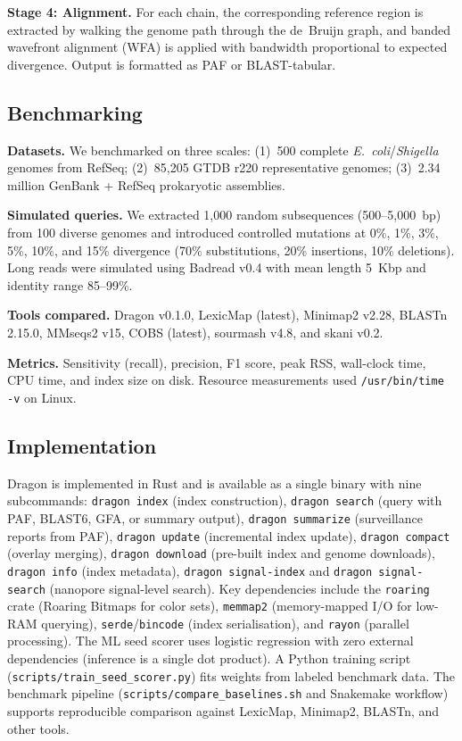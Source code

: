 \documentclass[11pt]{article}
\begin{document}
\textbf{Stage 4: Alignment.} For each chain, the corresponding reference region is extracted by walking the genome path through the de~Bruijn graph, and banded wavefront alignment (WFA) \citep{marco2021fast} is applied with bandwidth proportional to expected divergence. Output is formatted as PAF or BLAST-tabular.

\subsection{Benchmarking}

\textbf{Datasets.} We benchmarked on three scales: (1)~500 complete \textit{E.~coli}/\textit{Shigella} genomes from RefSeq; (2)~85,205 GTDB r220 representative genomes; (3)~2.34 million GenBank + RefSeq prokaryotic assemblies.

\textbf{Simulated queries.} We extracted 1,000 random subsequences (500--5,000~bp) from 100 diverse genomes and introduced controlled mutations at 0\%, 1\%, 3\%, 5\%, 10\%, and 15\% divergence (70\% substitutions, 20\% insertions, 10\% deletions). Long reads were simulated using Badread v0.4 with mean length 5~Kbp and identity range 85--99\%.

\textbf{Tools compared.} Dragon v0.1.0, LexicMap (latest), Minimap2 v2.28, BLASTn 2.15.0, MMseqs2 v15, COBS (latest), sourmash v4.8, and skani v0.2.

\textbf{Metrics.} Sensitivity (recall), precision, F1 score, peak RSS, wall-clock time, CPU time, and index size on disk. Resource measurements used \texttt{/usr/bin/time -v} on Linux.

\subsection{Implementation}

Dragon is implemented in Rust and is available as a single binary with nine subcommands: \texttt{dragon index} (index construction), \texttt{dragon search} (query with PAF, BLAST6, GFA, or summary output), \texttt{dragon summarize} (surveillance reports from PAF), \texttt{dragon update} (incremental index update), \texttt{dragon compact} (overlay merging), \texttt{dragon download} (pre-built index and genome downloads), \texttt{dragon info} (index metadata), \texttt{dragon signal-index} and \texttt{dragon signal-search} (nanopore signal-level search). Key dependencies include the \texttt{roaring} crate (Roaring Bitmaps for color sets), \texttt{memmap2} (memory-mapped I/O for low-RAM querying), \texttt{serde}/\texttt{bincode} (index serialisation), and \texttt{rayon} (parallel processing). The ML seed scorer uses logistic regression with zero external dependencies (inference is a single dot product). A Python training script (\texttt{scripts/train\_seed\_scorer.py}) fits weights from labeled benchmark data. The benchmark pipeline (\texttt{scripts/compare\_baselines.sh} and Snakemake workflow) supports reproducible comparison against LexicMap, Minimap2, BLASTn, and other tools.
\end{document}
